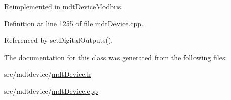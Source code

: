 Reimplemented in \hyperlink{classmdt_device_modbus_a6713edaee0bfba48791008124299b753}{mdt\-Device\-Modbus}.



Definition at line 1255 of file mdt\-Device.\-cpp.



Referenced by set\-Digital\-Outputs().



The documentation for this class was generated from the following files\-:\begin{DoxyCompactItemize}
\item 
src/mdtdevice/\hyperlink{mdt_device_8h}{mdt\-Device.\-h}\item 
src/mdtdevice/\hyperlink{mdt_device_8cpp}{mdt\-Device.\-cpp}\end{DoxyCompactItemize}
